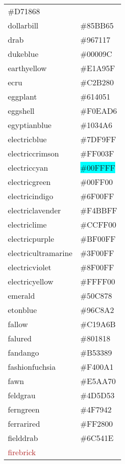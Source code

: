 \documentclass[
]{article}
\begin{document}
\begin{longtable}[]{@{}ll@{}}
\colorbox{dogwoodrose}{\#D71868}\tabularnewline
\textcolor{dollarbill}{dollarbill} &
\colorbox{dollarbill}{\#85BB65}\tabularnewline
\textcolor{drab}{drab} & \colorbox{drab}{\#967117}\tabularnewline
\textcolor{dukeblue}{dukeblue} &
\colorbox{dukeblue}{\#00009C}\tabularnewline
\textcolor{earthyellow}{earthyellow} &
\colorbox{earthyellow}{\#E1A95F}\tabularnewline
\textcolor{ecru}{ecru} &
\colorbox{darkchampagne}{\#C2B280}\tabularnewline
\textcolor{eggplant}{eggplant} &
\colorbox{eggplant}{\#614051}\tabularnewline
\textcolor{eggshell}{eggshell} &
\colorbox{eggshell}{\#F0EAD6}\tabularnewline
\textcolor{egyptianblue}{egyptianblue} &
\colorbox{egyptianblue}{\#1034A6}\tabularnewline
\textcolor{electricblue}{electricblue} &
\colorbox{electricblue}{\#7DF9FF}\tabularnewline
\textcolor{electriccrimson}{electriccrimson} &
\colorbox{electriccrimson}{\#FF003F}\tabularnewline
\textcolor{electriccyan}{electriccyan} &
\colorbox{aqua}{\#00FFFF}\tabularnewline
\textcolor{electricgreen}{electricgreen} &
\colorbox{electricgreen}{\#00FF00}\tabularnewline
\textcolor{electricindigo}{electricindigo} &
\colorbox{electricindigo}{\#6F00FF}\tabularnewline
\textcolor{electriclavender}{electriclavender} &
\colorbox{brilliantlavender}{\#F4BBFF}\tabularnewline
\textcolor{electriclime}{electriclime} &
\colorbox{electriclime}{\#CCFF00}\tabularnewline
\textcolor{electricpurple}{electricpurple} &
\colorbox{electricpurple}{\#BF00FF}\tabularnewline
\textcolor{electricultramarine}{electricultramarine} &
\colorbox{electricultramarine}{\#3F00FF}\tabularnewline
\textcolor{electricviolet}{electricviolet} &
\colorbox{electricviolet}{\#8F00FF}\tabularnewline
\textcolor{electricyellow}{electricyellow} &
\colorbox{electricyellow}{\#FFFF00}\tabularnewline
\textcolor{emerald}{emerald} &
\colorbox{emerald}{\#50C878}\tabularnewline
\textcolor{etonblue}{etonblue} &
\colorbox{etonblue}{\#96C8A2}\tabularnewline
\textcolor{fallow}{fallow} & \colorbox{camel}{\#C19A6B}\tabularnewline
\textcolor{falured}{falured} &
\colorbox{falured}{\#801818}\tabularnewline
\textcolor{fandango}{fandango} &
\colorbox{fandango}{\#B53389}\tabularnewline
\textcolor{fashionfuchsia}{fashionfuchsia} &
\colorbox{fashionfuchsia}{\#F400A1}\tabularnewline
\textcolor{fawn}{fawn} & \colorbox{fawn}{\#E5AA70}\tabularnewline
\textcolor{feldgrau}{feldgrau} &
\colorbox{feldgrau}{\#4D5D53}\tabularnewline
\textcolor{ferngreen}{ferngreen} &
\colorbox{ferngreen}{\#4F7942}\tabularnewline
\textcolor{ferrarired}{ferrarired} &
\colorbox{ferrarired}{\#FF2800}\tabularnewline
\textcolor{fielddrab}{fielddrab} &
\colorbox{fielddrab}{\#6C541E}\tabularnewline
\textcolor{firebrick}{firebrick} &

\end{longtable}
\end{document}
